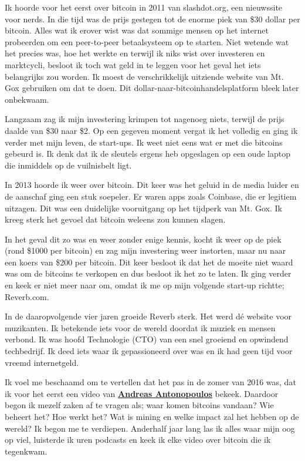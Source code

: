 \documentclass[
  letterpaper,
]{scrbook}
\begin{document}
Ik hoorde voor het eerst over bitcoin in 2011 van slashdot.org, een
nieuwssite voor nerds. In die tijd was de prijs gestegen tot de enorme
piek van \$30 dollar per bitcoin. Alles wat ik erover wist was dat
sommige mensen op het internet probeerden om een peer-to-peer
betaalsysteem op te starten. Niet wetende wat het precies was, hoe het
werkte en terwijl ik niks wist over investeren en marktcycli, besloot ik
toch wat geld in te leggen voor het geval het iets belangrijks zou
worden. Ik moest de verschrikkelijk uitziende website van Mt. Gox
gebruiken om dat te doen. Dit dollar-naar-bitcoinhandelsplatform bleek
later onbekwaam.

Langzaam zag ik mijn investering krimpen tot nagenoeg niets, terwijl de
prijs daalde van \$30 naar \$2. Op een gegeven moment vergat ik het
volledig en ging ik verder met mijn leven, de start-ups. Ik weet niet
eens wat er met die bitcoins gebeurd is. Ik denk dat ik de sleutels
ergens heb opgeslagen op een oude laptop die inmiddels op de vuilnisbelt
ligt.

In 2013 hoorde ik weer over bitcoin. Dit keer was het geluid in de media
luider en de aanschaf ging een stuk soepeler. Er waren apps zoals
Coinbase, die er legitiem uitzagen. Dit was een duidelijke vooruitgang
op het tijdperk van Mt. Gox. Ik kreeg sterk het gevoel dat bitcoin
weleens zou kunnen slagen.

In het geval dit zo was en weer zonder enige kennis, kocht ik weer op de
piek (rond \$1000 per bitcoin) en zag mijn investering weer instorten,
maar nu naar een koers van \$200 per bitcoin. Dit keer besloot ik dat
het de moeite niet waard was om de bitcoins te verkopen en dus besloot
ik het zo te laten. Ik ging verder en keek er niet meer naar om, omdat
ik me op mijn volgende start-up richtte; Reverb.com.

In de daaropvolgende vier jaren groeide Reverb sterk. Het werd dé
website voor muzikanten. Ik betekende iets voor de wereld doordat ik
muziek en mensen verbond. Ik was hoofd Technologie (CTO) van een snel
groeiend en opwindend techbedrijf. Ik deed iets waar ik gepassioneerd
over was en ik had geen tijd voor vreemd internetgeld.

Ik voel me beschaamd om te vertellen dat het pas in de zomer van 2016
was, dat ik voor het eerst een video van
\href{https://www.youtube.com/channel/UCJWCJCWOxBYSi5DhCieLOLQ}{\textbf{Andreas
Antonopoulos}} bekeek. Daardoor begon ik mezelf zaken af te vragen als;
waar komen bitcoins vandaan? Wie beheert het? Hoe werkt het? Wat is
mining en welke impact zal het hebben op de wereld? Ik begon me te
verdiepen. Anderhalf jaar lang las ik alles waar mijn oog op viel,
luisterde ik uren podcasts en keek ik elke video over bitcoin die ik
tegenkwam.
\end{document}
